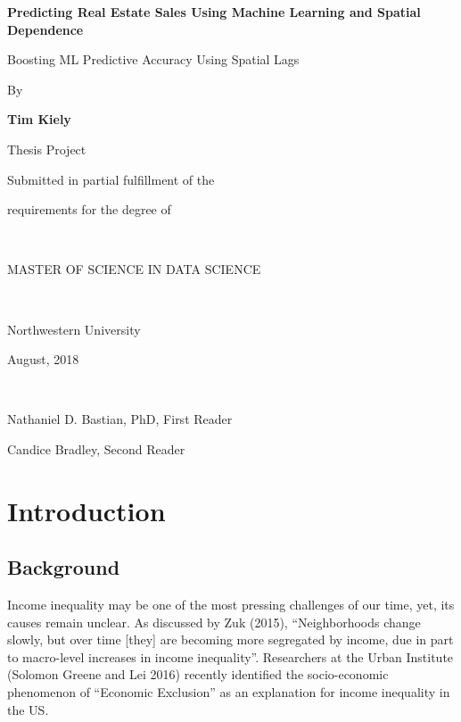 \documentclass[12pt,]{article}
\title{}
\author{}
\date{}
\begin{document}

\titlepage
\center
\vspace{4 cm}
\LARGE

\bf 
Predicting Real Estate Sales Using Machine Learning and Spatial Dependence

\Large

Boosting ML Predictive Accuracy Using Spatial Lags

\rm
\normalsize

By

\textbf{Tim Kiely}

Thesis Project

Submitted in partial fulfillment of the

requirements for the degree of

~

MASTER OF SCIENCE IN DATA SCIENCE

~

Northwestern University

August, 2018

~

Nathaniel D. Bastian, PhD, First Reader

Candice Bradley, Second Reader

\newpage
\normalsize
\singlespace
\tableofcontents
\doublespace
\newpage
{}

\pagestyle{plain}
\justify

\hypertarget{introduction}{%
\section{Introduction}\label{introduction}}

\hypertarget{background}{%
\subsection{Background}\label{background}}

Income inequality may be one of the most pressing challenges of our
time, yet, its causes remain unclear. As discussed by Zuk (2015),
``Neighborhoods change slowly, but over time {[}they{]} are becoming
more segregated by income, due in part to macro-level increases in
income inequality''. Researchers at the Urban Institute (Solomon Greene
and Lei 2016) recently identified the socio-economic phenomenon of
``Economic Exclusion'' as an explanation for income inequality in the
US.
\end{document}
